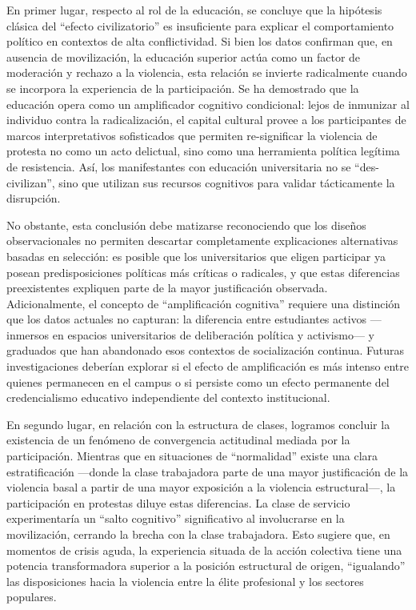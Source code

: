 \documentclass[
  13pt,
]{article}
\begin{document}
En primer lugar, respecto al rol de la educación, se concluye que la
hipótesis clásica del ``efecto civilizatorio'' es insuficiente para
explicar el comportamiento político en contextos de alta conflictividad.
Si bien los datos confirman que, en ausencia de movilización, la
educación superior actúa como un factor de moderación y rechazo a la
violencia, esta relación se invierte radicalmente cuando se incorpora la
experiencia de la participación. Se ha demostrado que la educación opera
como un amplificador cognitivo condicional: lejos de inmunizar al
individuo contra la radicalización, el capital cultural provee a los
participantes de marcos interpretativos sofisticados que permiten
re-significar la violencia de protesta no como un acto delictual, sino
como una herramienta política legítima de resistencia. Así, los
manifestantes con educación universitaria no se ``des-civilizan'', sino
que utilizan sus recursos cognitivos para validar tácticamente la
disrupción.

No obstante, esta conclusión debe matizarse reconociendo que los diseños
observacionales no permiten descartar completamente explicaciones
alternativas basadas en selección: es posible que los universitarios que
eligen participar ya posean predisposiciones políticas más críticas o
radicales, y que estas diferencias preexistentes expliquen parte de la
mayor justificación observada. Adicionalmente, el concepto de
``amplificación cognitiva'' requiere una distinción que los datos
actuales no capturan: la diferencia entre estudiantes activos
---inmersos en espacios universitarios de deliberación política y
activismo--- y graduados que han abandonado esos contextos de
socialización continua. Futuras investigaciones deberían explorar si el
efecto de amplificación es más intenso entre quienes permanecen en el
campus o si persiste como un efecto permanente del credencialismo
educativo independiente del contexto institucional.

En segundo lugar, en relación con la estructura de clases, logramos
concluir la existencia de un fenómeno de convergencia actitudinal
mediada por la participación. Mientras que en situaciones de
``normalidad'' existe una clara estratificación ---donde la clase
trabajadora parte de una mayor justificación de la violencia basal a
partir de una mayor exposición a la violencia estructural---, la
participación en protestas diluye estas diferencias. La clase de
servicio experimentaría un ``salto cognitivo'' significativo al
involucrarse en la movilización, cerrando la brecha con la clase
trabajadora. Esto sugiere que, en momentos de crisis aguda, la
experiencia situada de la acción colectiva tiene una potencia
transformadora superior a la posición estructural de origen,
``igualando'' las disposiciones hacia la violencia entre la élite
profesional y los sectores populares.
\end{document}
